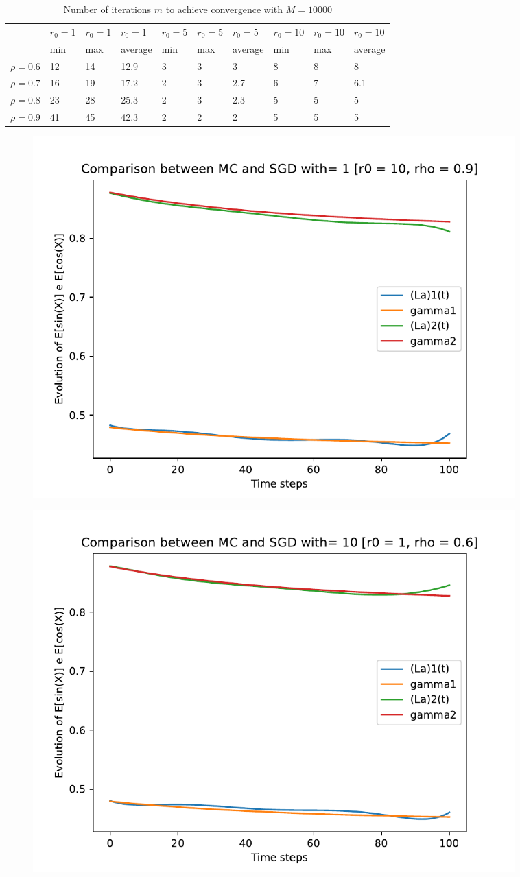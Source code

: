 \documentclass[a4paper,11pt,openright]{report}
\begin{document}
\begin{table}[H]
\centering
\addtolength{\leftskip}{-1.5cm}
\addtolength{\rightskip}{-1.5cm}
\begin{tabular}{|c|lllllllll|}
\hline
$ $ & $r_0 = 1$ & $r_0 = 1$ & $r_0 = 1$ & $r_0 = 5$ & $r_0 = 5$ & $r_0 = 5$ & $r_0 = 10$ & $r_0 = 10$ & $r_0 = 10$  \\
$ $ & min & max & average & min & max & average & min & max & average \\ 
\hline
$\rho = 0.6$ & 12 & 14 & 12.9 & 3 & 3 & 3 & 8 & 8 & 8 \\

$\rho = 0.7$ & 16 & 19 & 17.2 & 2 & 3 & 2.7 & 6 & 7 & 6.1\\

$\rho = 0.8$ & 23 & 28 & 25.3 & 2 & 3 & 2.3 & 5 & 5 & 5\\

$\rho = 0.9$ & 41 & 45 & 42.3 & 2 & 2 & 2 & 5 & 5 & 5\\
\hline
\end{tabular}
\caption{Number of iterations $m$ to achieve convergence with $M = 10000$}
\end{table}
\begin{figure}[H]
\centering
\includegraphics[width=0.9\textwidth]{images/graphs T = 1/n = 6, M = 1 sine and cosine.pdf}
\end{figure}
\begin{figure}[H]
\centering
\includegraphics[width=0.9\textwidth]{images/graphs T = 1/n = 6, M = 10 sine and cosine.pdf}
\end{figure}
\end{document}

